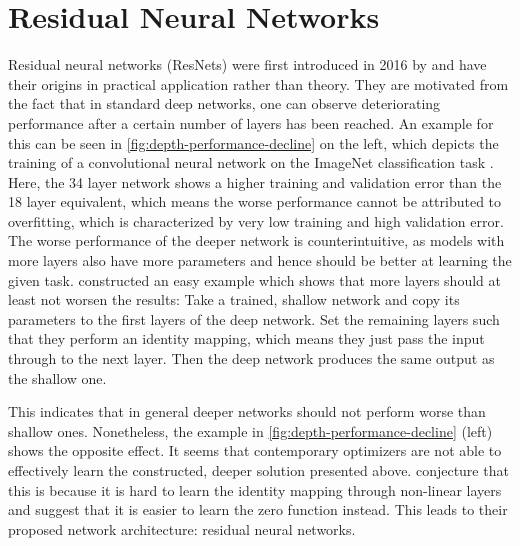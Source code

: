 \section{Residual Neural Networks}
\label{sec:neural-networks}

Residual neural networks (ResNets) were first introduced in 2016 by \citet{he16} and have their origins in practical application rather than theory.
They are motivated from the fact that in standard deep networks, one can observe deteriorating performance after a certain number of layers has been reached.
An example for this can be seen in \cref{fig:depth-performance-decline} on the left, which depicts the training of a convolutional neural network on the ImageNet classification task \cite{deng09}.
Here, the 34 layer network shows a higher training and validation error than the 18 layer equivalent, which means the worse performance cannot be attributed to overfitting, which is characterized by very low training and high validation error. 
The worse performance of the deeper network is counterintuitive, as models with more layers also have more parameters and hence should be better at learning the given task.
\citet{he16} constructed an easy example which shows that more layers should at least not worsen the results:
Take a trained, shallow network and copy its parameters to the first layers of the deep network.
Set the remaining layers such that they perform an identity mapping, which means they just pass the input through to the next layer.
Then the deep network produces the same output as the shallow one.




This indicates that in general deeper networks should not perform worse than shallow ones.
Nonetheless, the example in \cref{fig:depth-performance-decline} (left) shows the opposite effect.
It seems that contemporary optimizers are not able to effectively learn the constructed, deeper solution presented above.
\citet{he16} conjecture that this is because it is hard to learn the identity mapping through non-linear layers and suggest that it is easier to learn the zero function instead.
This leads to their proposed network architecture: residual neural networks.

